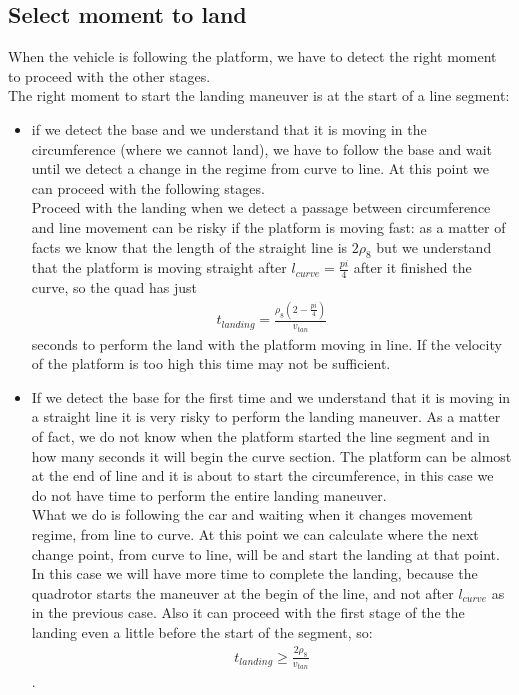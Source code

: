 \subsection{Select moment to land}
When the vehicle is following the platform, we have to detect the right moment to proceed with the other stages.\\
The right moment to start the landing maneuver is at the start of a line segment:
\begin{itemize}
\item if we detect the base and we understand that it is moving in the circumference (where we cannot land), we have to follow the base and wait until we detect a change in the regime from curve to line. At this point we can proceed with the following stages.\\
Proceed with the landing when we detect a passage between circumference and line movement can be risky if the platform is moving fast: as a matter of facts we know that the length of the straight line is $2\rho_8$ but we understand that the platform is moving straight after $l_{curve} = \frac{pi}{4}$ after it finished the curve, so the quad has just 
\begin{align}
t_{landing} = \frac{\rho_8(2-\frac{pi}{4})}{v_{tan}}
\end{align}
seconds to perform the land with the platform moving in line. If the velocity of the platform is too high this time may not be sufficient.
\item If we detect the base for the first time and we understand that it is moving in a straight line it is very risky to perform the landing maneuver. As a matter of fact, we do not know when the platform started the line segment and in how many seconds it will begin the curve section. The platform can be almost at the end of line and it is about to start the circumference, in this case we do not have time to perform the entire landing maneuver.\\
What we do is following the car and waiting when it changes movement regime, from line to curve. At this point we can calculate where the next change point, from curve to line, will be and start the landing at that point.\\
In this case we will have more time to complete the landing, because the quadrotor starts the maneuver at the begin of the line, and not after $l_{curve}$ as in the previous case. Also it can proceed with the first stage of the the landing even a little before the start of the segment, so:
\begin{align}
t_{landing} \geq \frac{2\rho_8}{v_{tan}}
\end{align}.


\end{itemize}
